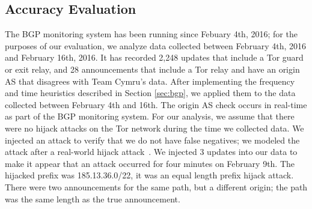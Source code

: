 


\subsection{Accuracy Evaluation}
\label{sec:eval}
The BGP monitoring system has been running since Febuary 4th, 2016; for the purposes of our evaluation, we analyze data collected between February 4th, 2016 and February 16th, 2016.  It has recorded 2,248 updates that include a Tor guard or exit relay, and 28 announcements that include a Tor relay and have an origin AS that disagrees with Team Cymru's data.  After implementing the frequency and time heuristics described in Section \ref{sec:bgp}, we applied them to the data collected between February 4th and 16th.  The origin AS check occurs in real-time as part of the BGP monitoring system.  For our analysis, we assume that there were no hijack attacks on the Tor network during the time we collected data.  We injected an attack to verify that we do not have false negatives; we modeled the attack after a real-world hijack attack~\cite{syriahijack}.  We injected 3 updates into our data to make it appear that an attack occurred for four minutes on February 9th.  The hijacked prefix was 185.13.36.0/22, it was an equal length prefix hijack attack.  There were two announcements for the same path, but a different origin; the path was the same length as the true announcement.  

